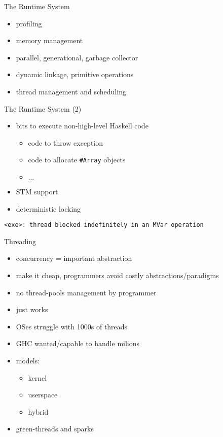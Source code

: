 \documentclass{beamer}
\begin{document}
\begin{frame}{The Runtime System}
  \begin{itemize}
    \item profiling
    \item memory management
    \item parallel, generational, garbage collector
    \item dynamic linkage, primitive operations
    \item thread management and scheduling
  \end{itemize}
  \centering
\end{frame}

\begin{frame}{The Runtime System (2)}
  \begin{itemize}[<+->]
    \item bits to execute non-high-level Haskell code
    \begin{itemize}
      \item code to throw exception
      \item code to allocate \texttt{\#Array} objects
      \item $\ldots$
    \end{itemize}
    \item STM support
    \item deterministic locking
  \end{itemize}
  \pause
  \texttt{<exe>: thread blocked indefinitely in an MVar operation}
\end{frame}

\begin{frame}{Threading}
  \begin{itemize}
    \item concurrency = important abstraction
    \item make it cheap, programmers avoid costly abstractions/paradigms
    \item no thread-pools management by programmer
    \item just works
    \pause
    \item OSes struggle with 1000s of threads
    \item GHC wanted/capable to handle milions
    \pause
    \item models:
    \begin{itemize}
      \item kernel
      \item userspace
      \item hybrid
    \end{itemize}
    \pause
    \item green-threads and sparks
  \end{itemize}
\end{frame}
\end{document}
